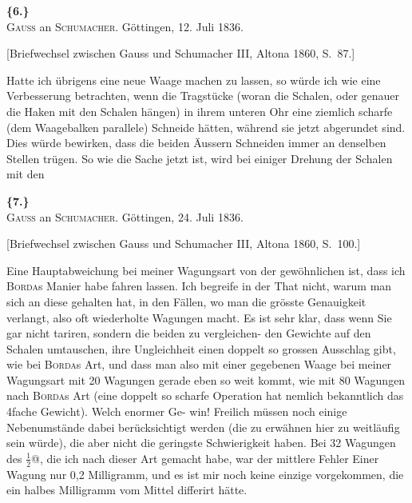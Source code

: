 \documentclass[12pt,a4paper]{article}
\theoremstyle{plain}
\theoremstyle{definition}
\theoremstyle{remark}
\begin{document}
\vspace{0.5cm}

\noindent\textbf{\{6.\}}\\
\textsc{Gauss} an \textsc{Schumacher}. G\"ottingen, 12. Juli 1836.

\vspace{0.2cm}
{\small[Briefwechsel zwischen Gauss und Schumacher III, Altona 1860, S.~87.]}

\vspace{0.3cm}

Hatte ich \"ubrigens eine neue Waage machen zu lassen, so w\"urde ich
wie eine Verbesserung betrachten, wenn die Tragst\"ucke (woran die Schalen,
oder genauer die Haken mit den Schalen h\"angen) in ihrem unteren Ohr
eine ziemlich scharfe (dem Waagebalken parallele) Schneide h\"atten, w\"ahrend
sie jetzt abgerundet sind. Dies w\"urde bewirken, dass die beiden \"Aussern
Schneiden immer an denselben Stellen tr\"ugen. So wie die Sache jetzt ist,
wird bei einiger Drehung der Schalen mit den

\vspace{0.5cm}

\noindent\textbf{\{7.\}}\\
\textsc{Gauss} an \textsc{Schumacher}. G\"ottingen, 24. Juli 1836.

\vspace{0.2cm}
{\small[Briefwechsel zwischen Gauss und Schumacher III, Altona 1860, S.~100.]}

\vspace{0.3cm}

Eine Hauptabweichung bei meiner Wagungsart von der gew\"ohnlichen
ist, dass ich \textsc{Borda}s Manier habe fahren lassen. Ich begreife in der That
nicht, warum man sich an diese gehalten hat, in den F\"allen, wo man die
gr\"osste Genauigkeit verlangt, also oft wiederholte Wagungen macht. Es ist
sehr klar, dass wenn Sie gar nicht tariren, sondern die beiden zu vergleichen-
den Gewichte auf den Schalen umtauschen, ihre Ungleichheit einen doppelt
so grossen Ausschlag gibt, wie bei \textsc{Borda}s Art, und dass man also mit einer
gegebenen Waage bei meiner Wagungsart mit 20 Wagungen gerade eben so
weit kommt, wie mit 80 Wagungen nach \textsc{Borda}s Art (eine doppelt so scharfe
Operation hat nemlich bekanntlich das 4fache Gewicht). Welch enormer Ge-
win! Freilich m\"ussen noch einige Nebenumst\"ande dabei ber\"ucksichtigt werden
(die zu erw\"ahnen hier zu weitl\"aufig sein w\"urde), die aber nicht die geringste
Schwierigkeit haben. Bei 32 Wagungen des $\frac{1}{2}$@, die ich nach dieser Art
gemacht habe, war der mittlere Fehler Einer Wagung nur 0,2 Milligramm,
und es ist mir noch keine einzige vorgekommen, die ein halbes Milligramm
vom Mittel differirt h\"atte.
\end{document}
